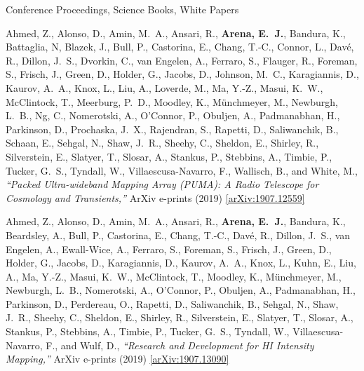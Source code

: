 \documentclass{resume} %
\begin{document}

\begin{rSection}{Conference Proceedings, Science Books, White Papers}

\begin{etaremune}

\item {Ahmed}, Z., {Alonso}, D., {Amin}, M.~A.,
         {Ansari}, R., \textbf{{Arena}, E.~J.}, {Bandura}, K.,
         {Battaglia}, N, {Blazek}, J., 
         {Bull}, P., {Castorina}, E.,
         {Chang}, T.-C., {Connor}, L., {Dav{\'e}}, R., {Dillon}, J.~S.,
         {Dvorkin}, C.,
         {van Engelen}, A., {Ferraro}, S., {Flauger}, R.,
         {Foreman}, S., {Frisch}, J., {Green}, D.,
         {Holder}, G., {Jacobs}, D., {Johnson}, M.~C.,
         {Karagiannis}, D.,
         {Kaurov}, A.~A., {Knox}, L., 
         {Liu}, A., {Loverde}, M., {Ma}, Y.-Z., {Masui}, K.~W.,
         {McClintock}, T., {Meerburg}, P.~D., {Moodley}, K.,
         {M{\"u}nchmeyer}, M., {Newburgh}, L.~B., {Ng}, C.,
         {Nomerotski}, A., {O'Connor}, P., {Obuljen}, A.,
         {Padmanabhan}, H., {Parkinson}, D., {Prochaska}, J.~X.,
         {Rajendran}, S.,
         {Rapetti}, D., {Saliwanchik}, B., {Schaan}, E., {Sehgal}, N.,
         {Shaw}, J.~R., {Sheehy}, C., {Sheldon}, E.,
         {Shirley}, R., {Silverstein}, E., {Slatyer}, T.,
         {Slosar}, A., {Stankus}, P., {Stebbins}, A.,
         {Timbie}, P., {Tucker}, G.~S., {Tyndall}, W.,
         {Villaescusa-Navarro}, F., {Wallisch}, B., and {White}, M.,
\textit{``Packed Ultra-wideband Mapping Array (PUMA): A Radio Telescope for Cosmology and Transients,''} ArXiv e-prints (2019) \href{https://arxiv.org/abs/1907.12559}{[arXiv:1907.12559]}

\item {Ahmed}, Z., {Alonso}, D., {Amin}, M.~A.,
         {Ansari}, R., \textbf{{Arena}, E.~J.}, {Bandura}, K.,
         {Beardsley}, A., {Bull}, P., {Castorina}, E.,
         {Chang}, T.-C., {Dav{\'e}}, R., {Dillon}, J.~S.,
         {van Engelen}, A., {Ewall-Wice}, A., {Ferraro}, S.,
         {Foreman}, S., {Frisch}, J., {Green}, D.,
         {Holder}, G., {Jacobs}, D., {Karagiannis}, D.,
         {Kaurov}, A.~A., {Knox}, L., {Kuhn}, E.,
         {Liu}, A., {Ma}, Y.-Z., {Masui}, K.~W.,
         {McClintock}, T., {Moodley}, K.,
         {M{\"u}nchmeyer}, M., {Newburgh}, L.~B.,
         {Nomerotski}, A., {O'Connor}, P., {Obuljen}, A.,
         {Padmanabhan}, H., {Parkinson}, D., {Perdereau}, O.,
         {Rapetti}, D., {Saliwanchik}, B., {Sehgal}, N.,
         {Shaw}, J.~R., {Sheehy}, C., {Sheldon}, E.,
         {Shirley}, R., {Silverstein}, E., {Slatyer}, T.,
         {Slosar}, A., {Stankus}, P., {Stebbins}, A.,
         {Timbie}, P., {Tucker}, G.~S., {Tyndall}, W.,
         {Villaescusa-Navarro}, F., and {Wulf}, D.,
\textit{``Research and Development for HI Intensity Mapping,''} ArXiv e-prints (2019) \href{https://arxiv.org/abs/1907.13090}{[arXiv:1907.13090]}



\end{etaremune}
\end{rSection}
\end{document}
